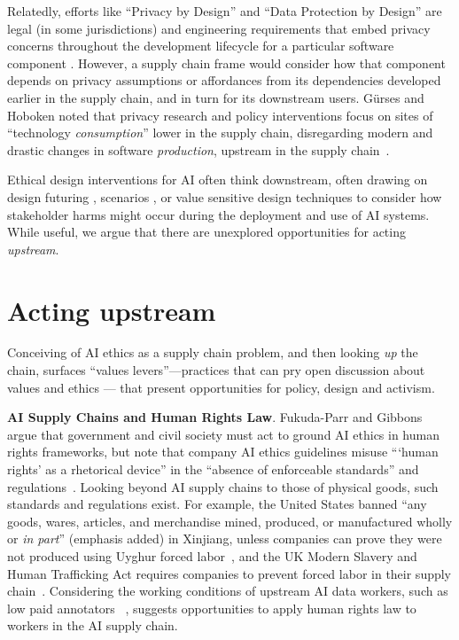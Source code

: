 \documentclass[nonacm]{acmart}
\begin{document}
Relatedly, efforts like ``Privacy by Design'' and ``Data Protection by Design'' are legal (in some jurisdictions) and engineering requirements that embed privacy concerns throughout the development lifecycle for a particular software component \cite{wong2019bringing}. However, a supply chain frame would consider how that component depends on privacy assumptions or affordances from its dependencies developed earlier in the supply chain, and in turn for its downstream users. G\"{u}rses and Hoboken noted that privacy research and policy interventions focus on sites of ``technology \textit{consumption}'' lower in the supply chain, disregarding modern and drastic changes in software \textit{production}, upstream in the supply chain~\cite{gurses2018agile}.

Ethical design interventions for AI often think downstream, often drawing on design futuring \cite{ballard_judgment_2019,wong2021tactics,fiesler_black_2018,martelaro2020could}, scenarios \cite{zevenbergen2020explainability}, or value sensitive design techniques \cite{shen_value_2021} to consider how stakeholder harms might occur during the deployment and use of AI systems. While useful, we argue that there are unexplored opportunities for acting \textit{upstream}.


\section{Acting upstream}
Conceiving of AI ethics as a supply chain problem, and then looking \textit{up} the chain, surfaces ``values levers''---practices that can pry open discussion about values and ethics \cite{shilton_values_2013} --- that present opportunities for policy, design and activism.

\noindent\textbf{AI Supply Chains and Human Rights Law}. 
Fukuda-Parr and Gibbons argue that government and civil society must act to ground AI ethics in human rights frameworks, but note that company AI ethics guidelines misuse ```human rights' as a rhetorical device'' in the ``absence of enforceable standards'' and regulations~\cite{fukuda-parr2021emerging}. Looking beyond AI supply chains to those of physical goods, such standards and regulations exist. For example, the United States banned ``any goods, wares, articles, and merchandise mined, produced, or manufactured wholly or \textit{in part}'' (emphasis added) in Xinjiang, unless companies can prove they were not produced using Uyghur forced labor~\cite{flacks2022uyghur}, and the UK Modern Slavery and Human Trafficking Act requires companies to prevent forced labor in their supply chain~\cite{kriebitz2020xinjiang}. Considering the working conditions of upstream AI data workers, such as low paid annotators ~\cite{2023exclusive}, suggests opportunities to apply human rights law to workers in the AI supply chain.
\end{document}
